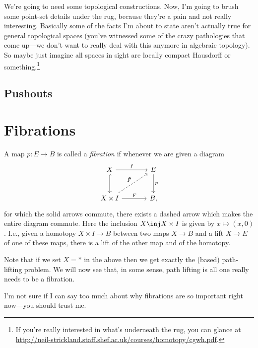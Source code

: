 We're going to need some topological constructions. Now, I'm going to
brush some point-set details under the rug, because they're a pain and
not really interesting. Basically some of the facts I'm about to state
aren't actually true for general topological spaces (you've witnessed
some of the crazy pathologies that come up---we don't want to really
deal with this anymore in algebraic topology). So maybe just imagine
all spaces in sight are locally compact Hausdorff or
something.\footnote{If you're really interested in what's underneath
  the rug, you can glance at
  \url{http://neil-strickland.staff.shef.ac.uk/courses/homotopy/cgwh.pdf}.}

\subsection{Pushouts}


\section{Fibrations}

\begin{definition}
  A map $p : E \to B$ is called a \textit{fibration} if whenever we
  are given a diagram
  \[
  \begin{tikzcd}[column sep = large, row sep = large]
    X \ar[hookrightarrow]{d} \rar{f} & E \dar{p} \\ X \times I
    \ar[dashed]{ur}{\tilde{F}} \rar{F} & B,
  \end{tikzcd}
  \]
  for which the solid arrows commute, there exists a dashed arrow
  which makes the entire diagram commute. Here the inclusion $X \inj X
  \times I$ is given by $x \mapsto (x,0)$. I.e., given a homotopy $X
  \times I \to B$ between two maps $X \to B$ and a lift $X \to E$ of
  one of these maps, there is a lift of the other map and of the
  homotopy.
\end{definition}

\begin{remark}
  Note that if we set $X = *$ in the above then we get exactly the
  (based) path-lifting problem. We will now see that, in some sense,
  path lifting is all one really needs to be a fibration.
\end{remark}

I'm not sure if I can say too much about why fibrations are so
important right now---you should trust me.


